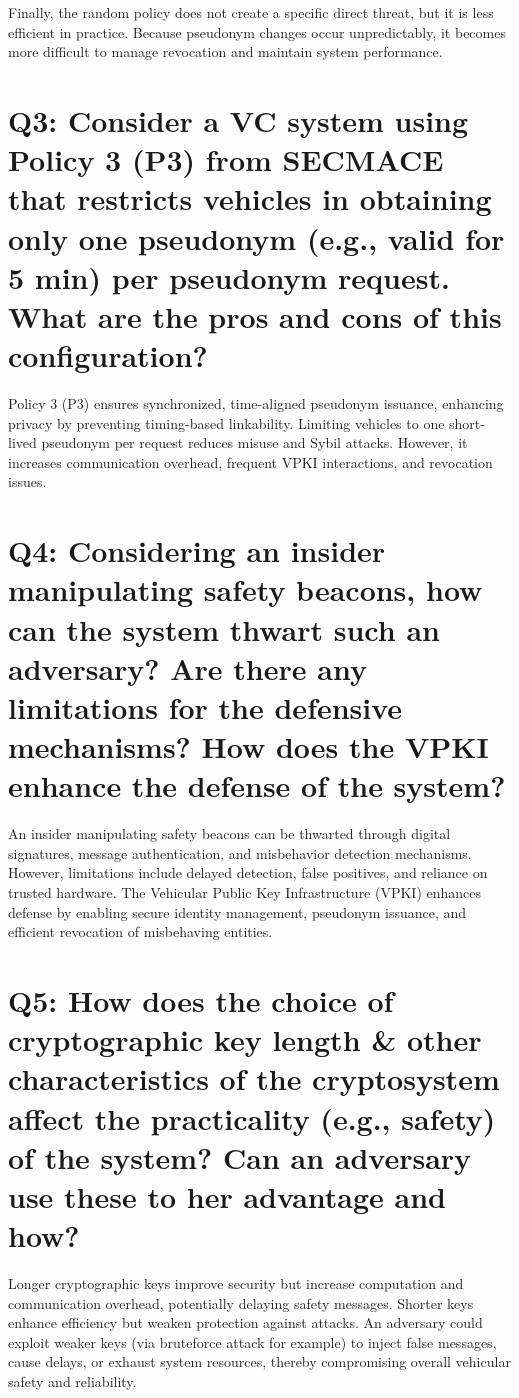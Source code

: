\documentclass{article}
\begin{document}
Finally, the random policy does not create a specific direct threat, but it is less efficient in practice. Because pseudonym changes occur unpredictably, it becomes more difficult to manage revocation and maintain system performance.

\section*{
Q3: Consider a VC system using Policy 3 (P3) from SECMACE that restricts vehicles in obtaining only one pseudonym (e.g., valid for 5 min) per pseudonym request. What are the pros and cons of this configuration?
}

Policy 3 (P3) ensures synchronized, time-aligned pseudonym issuance, enhancing privacy by preventing timing-based linkability. Limiting vehicles to one short-lived pseudonym per request reduces misuse and Sybil attacks. However, it increases communication overhead, frequent VPKI interactions, and revocation issues.



\section*{
Q4: Considering an insider manipulating safety beacons, how can the system thwart such an adversary? Are there any limitations for the defensive mechanisms? How does the VPKI enhance the defense of the system?
}

An insider manipulating safety beacons can be thwarted through digital signatures, message authentication, and misbehavior detection mechanisms. However, limitations include delayed detection, false positives, and reliance on trusted hardware. The Vehicular Public Key Infrastructure (VPKI) enhances defense by enabling secure identity management, pseudonym issuance, and efficient revocation of misbehaving entities.

\section*{
Q5: How does the choice of cryptographic key length \& other characteristics of the cryptosystem affect the practicality (e.g., safety) of the system? Can an adversary use these to her advantage and how?
}

Longer cryptographic keys improve security but increase computation and communication overhead, potentially delaying safety messages. Shorter keys enhance efficiency but weaken protection against attacks. An adversary could exploit weaker keys (via bruteforce attack for example)  to inject false messages, cause delays, or exhaust system resources, thereby compromising overall vehicular safety and reliability.
\end{document}
